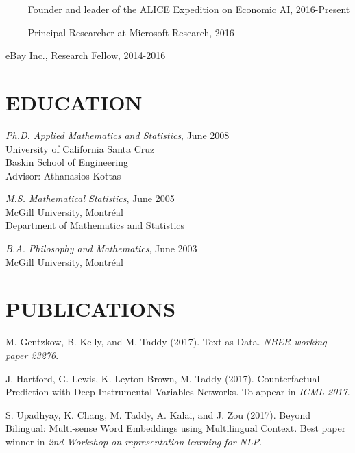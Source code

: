\documentclass[margin,line]{res}
\begin{document}
\begin{resume}
\vspace{-.4cm}~~~~ Founder and leader of the ALICE Expedition on Economic AI, 2016-Present

\vspace{-.4cm}~~~~ Principal Researcher at Microsoft Research, 2016


\vspace{-.2cm}
eBay Inc., Research Fellow, 2014-2016

\medskip
\section{\bf EDUCATION}

{\it Ph.D. Applied Mathematics and Statistics}, June 2008\\
{\sc University of California Santa Cruz}\\
Baskin School of Engineering\\
Advisor: Athanasios Kottas

\vspace{-0.2cm}
{\it M.S. Mathematical Statistics}, June 2005\\
{\sc McGill University, Montr\'eal}\\
 Department of Mathematics and Statistics

\vspace{-0.2cm}
{\it B.A. Philosophy and Mathematics}, June 2003\\
{\sc McGill University, Montr\'eal}

\medskip
\section{\bf PUBLICATIONS}


M. Gentzkow, B. Kelly, and M. Taddy (2017).  Text as Data. {\em NBER working paper 23276}.

J. Hartford, G. Lewis, K. Leyton-Brown, M. Taddy (2017).  Counterfactual Prediction with Deep Instrumental Variables Networks.  To appear in {\it ICML 2017}.

S. Upadhyay, K. Chang, M. Taddy, A. Kalai, and J. Zou (2017).  Beyond Bilingual: Multi-sense Word Embeddings using Multilingual
Context. Best paper winner in {\it 2nd Workshop on representation learning for NLP}.


\end{resume}
\end{document}
